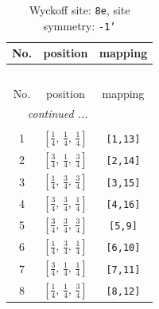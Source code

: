 \documentclass[fleqn,8pt]{jsarticle}
\begin{document}
\renewcommand{\arraystretch}{1.2}
\begin{longtable}{ccc}
\caption{Wyckoff site: {\tt 8e}, site symmetry: {\tt -1'}}
 \\
 \hline \hline
No. & position & mapping \\ \hline \endfirsthead

\multicolumn{2}{l}{\tablename\ \thetable{}} \\
 \hline \hline
No. & position & mapping \\ \hline \endhead

 \hline \hline
\multicolumn{2}{r}{\footnotesize\it continued ...} \\ \endfoot

 \hline \hline
\multicolumn{2}{r}{} \\ \endlastfoot

1 & $\left[ \frac{1}{4},\, \frac{1}{4},\, \frac{1}{4} \right]$ & {\tt [1,13]} \\ \hline
2 & $\left[ \frac{3}{4},\, \frac{1}{4},\, \frac{3}{4} \right]$ & {\tt [2,14]} \\ \hline
3 & $\left[ \frac{1}{4},\, \frac{3}{4},\, \frac{3}{4} \right]$ & {\tt [3,15]} \\ \hline
4 & $\left[ \frac{3}{4},\, \frac{3}{4},\, \frac{1}{4} \right]$ & {\tt [4,16]} \\ \hline
5 & $\left[ \frac{3}{4},\, \frac{3}{4},\, \frac{3}{4} \right]$ & {\tt [5,9]} \\ \hline
6 & $\left[ \frac{1}{4},\, \frac{3}{4},\, \frac{1}{4} \right]$ & {\tt [6,10]} \\ \hline
7 & $\left[ \frac{3}{4},\, \frac{1}{4},\, \frac{1}{4} \right]$ & {\tt [7,11]} \\ \hline
8 & $\left[ \frac{1}{4},\, \frac{1}{4},\, \frac{3}{4} \right]$ & {\tt [8,12]} \\
\end{longtable}
\renewcommand{\arraystretch}{1.2}
\end{document}

